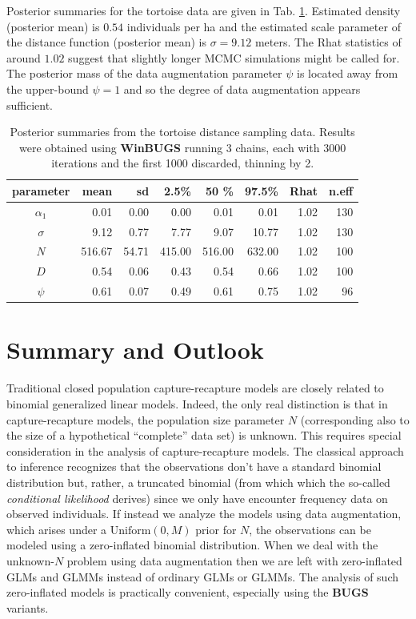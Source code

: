 Posterior summaries for the tortoise data are given in Tab. \ref{closed.tab.dsamp}.
Estimated density (posterior mean) is $0.54$ individuals
  per ha and the estimated scale parameter of the distance function
(posterior mean) is $\sigma=9.12$ meters.  The Rhat statistics of
around $1.02$ suggest that slightly longer MCMC simulations might be
called for. The posterior mass of the data augmentation parameter $\psi$
is located away from the upper-bound $\psi=1$ and so the degree of
data augmentation appears sufficient.

\begin{table}[ht]
  \caption{
    Posterior summaries from the tortoise distance sampling data. Results
    were obtained using {\bf WinBUGS}
    running
    3 chains, each with 3000 iterations and the first 1000 discarded,
    thinning by 2.
  }
\begin{tabular}{crrrrrrr} \hline \hline
 parameter &mean &   sd  & 2.5\%   &  50 \%  &   97.5\% &Rhat& n.eff
 \\ \hline
$\alpha_1$ &  0.01&  0.00 &   0.00 &  0.01   &   0.01 &1.02&   130   \\
$\sigma$  &   9.12&  0.77 &   7.77 &   9.07  &  10.77& 1.02&   130  \\
$N$       & 516.67& 54.71 & 415.00 & 516.00  & 632.00& 1.02&   100  \\
$D$       &   0.54&  0.06 &  0.43  & 0.54    &   0.66 &1.02&   100 \\
$\psi$    &   0.61&  0.07 &  0.49  & 0.61    &   0.75 &1.02&    96  \\ \hline
\end{tabular}
\label{closed.tab.dsamp}
\end{table}



\section{Summary and Outlook}

Traditional closed population capture-recapture models are closely
related to binomial generalized linear models.  Indeed, the only real
distinction is that in capture-recapture models, the population size
parameter $N$ (corresponding also to the size of a hypothetical
``complete'' data set) is unknown.  This requires special
consideration in the analysis of capture-recapture models. The
classical approach to inference recognizes that the observations don't
have a standard binomial distribution but, rather, a truncated
binomial (from which which the so-called {\it conditional likelihood}
derives) since we only have encounter frequency data on observed
individuals. If instead we analyze the models using data augmentation,
which arises under a $\mbox{Uniform}(0,M)$ prior for $N$,
the observations can be modeled using a zero-inflated binomial
distribution. When we deal with the unknown-$N$ problem using
data augmentation then we are left with zero-inflated GLMs and GLMMs
instead of ordinary GLMs or GLMMs. The analysis of such zero-inflated
models is practically convenient, especially using the
{\bf BUGS} variants.

